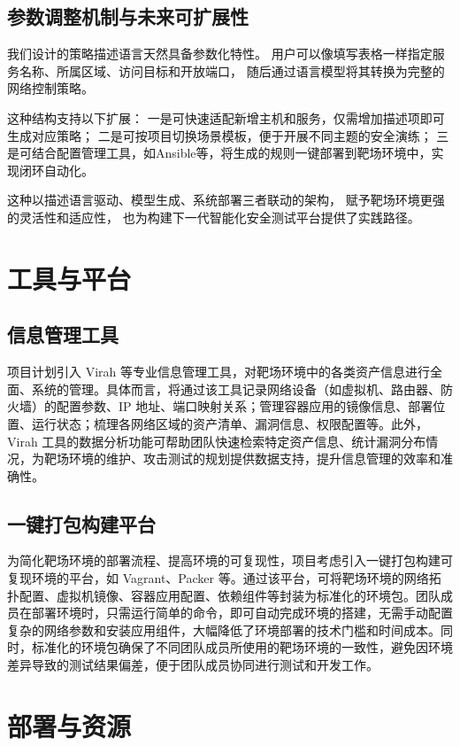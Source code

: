 \documentclass[lang=cn,10pt]{elegantbook}
\begin{document}
\subsection{参数调整机制与未来可扩展性}

我们设计的策略描述语言天然具备参数化特性。
用户可以像填写表格一样指定服务名称、所属区域、访问目标和开放端口，
随后通过语言模型将其转换为完整的网络控制策略。

这种结构支持以下扩展：
一是可快速适配新增主机和服务，仅需增加描述项即可生成对应策略；  
二是可按项目切换场景模板，便于开展不同主题的安全演练；  
三是可结合配置管理工具，如Ansible等，将生成的规则一键部署到靶场环境中，实现闭环自动化。

这种以描述语言驱动、模型生成、系统部署三者联动的架构，
赋予靶场环境更强的灵活性和适应性，
也为构建下一代智能化安全测试平台提供了实践路径。




\section{工具与平台}
\subsection{信息管理工具}
项目计划引入 Virah 等专业信息管理工具，对靶场环境中的各类资产信息进行全面、系统的管理。具体而言，将通过该工具记录网络设备（如虚拟机、路由器、防火墙）的配置参数、IP 地址、端口映射关系；管理容器应用的镜像信息、部署位置、运行状态；梳理各网络区域的资产清单、漏洞信息、权限配置等。此外，Virah 工具的数据分析功能可帮助团队快速检索特定资产信息、统计漏洞分布情况，为靶场环境的维护、攻击测试的规划提供数据支持，提升信息管理的效率和准确性。

\subsection{一键打包构建平台}
为简化靶场环境的部署流程、提高环境的可复现性，项目考虑引入一键打包构建可复现环境的平台，如 Vagrant、Packer 等。通过该平台，可将靶场环境的网络拓扑配置、虚拟机镜像、容器应用配置、依赖组件等封装为标准化的环境包。团队成员在部署环境时，只需运行简单的命令，即可自动完成环境的搭建，无需手动配置复杂的网络参数和安装应用组件，大幅降低了环境部署的技术门槛和时间成本。同时，标准化的环境包确保了不同团队成员所使用的靶场环境的一致性，避免因环境差异导致的测试结果偏差，便于团队成员协同进行测试和开发工作。

\section{部署与资源}
\end{document}
